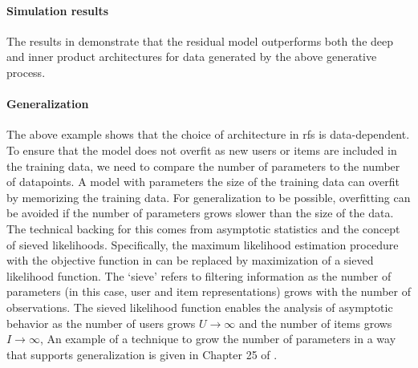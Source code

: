 

\paragraph{Simulation results} The results in  demonstrate
that the residual model outperforms both the deep and inner product
architectures for data generated by the above generative process.

\paragraph{Generalization} The above example shows that the choice of architecture in
\gls{rfs} is data-dependent. To ensure that the model does not
overfit as new users or items are included in the training data, we need to
compare the number of parameters to the number of datapoints. A model with
parameters the size of the training data can overfit by memorizing the training
data. For generalization to be possible, overfitting can be avoided if the
number of parameters grows slower than the size of the data. The technical
backing for this comes from asymptotic statistics and the concept of sieved
likelihoods. Specifically, the maximum likelihood estimation procedure with the
objective function in  can be replaced by maximization of a
sieved likelihood function. The `sieve' refers to filtering information as the
number of parameters (in this case, user and item representations) grows with
the number of observations. The sieved likelihood function enables the analysis
of asymptotic behavior as the number of users grows $U\rightarrow \infty$ and
the number of items grows $I\rightarrow \infty$, An example of a technique to
grow the number of parameters in a way that supports generalization is given in
Chapter 25 of \citet{vaart1998asymptotic}.


